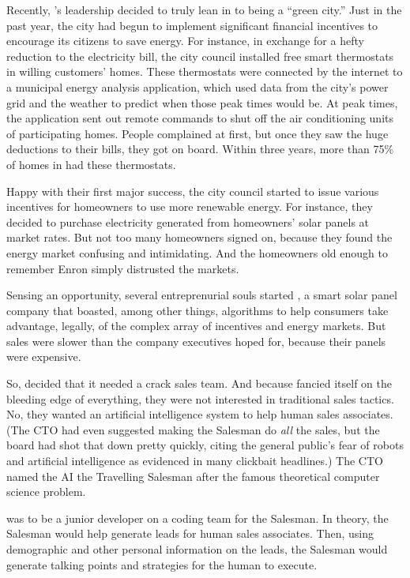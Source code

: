 Recently, \crunchyCity{}'s leadership decided to truly lean in to being a ``green city.'' Just in the past year, the city had begun to implement significant financial incentives to encourage its citizens to save energy. For instance, in exchange for a hefty reduction to the electricity bill, the city council installed free smart thermostats in willing customers' homes. These thermostats were connected by the internet to a municipal energy analysis application, which used data from the city's power grid and the weather to predict when those peak times would be. At peak times, the application sent out remote commands to shut off the air conditioning units of participating homes. People complained at first, but once they saw the huge deductions to their bills, they got on board. Within three years, more than 75\% of homes in \crunchyCity{} had these thermostats.


Happy with their first major success, the city council started to issue various incentives for homeowners to use more renewable energy. For instance, they decided to purchase electricity generated from homeowners' solar panels at market rates. But not too many homeowners signed on, because they found the energy market confusing and intimidating. And the homeowners old enough to remember Enron simply distrusted the markets.

Sensing an opportunity, several entreprenurial souls started \energyCompany{}, a smart solar panel company that boasted, among other things, algorithms to help consumers take advantage, legally, of the complex array of incentives and energy markets. But sales were slower than the company executives hoped for, because their panels were expensive.

So, \energyCompany{} decided that it needed a crack sales team. And because \energyCompany{} fancied itself on the bleeding edge of everything, they were not interested in traditional sales tactics. No, they wanted an artificial intelligence system to help human sales associates. (The \energyCompany{} CTO had even suggested making the Salesman do \emph{all} the sales, but the board had shot that down pretty quickly, citing the general public's fear of robots and artificial intelligence as evidenced in many clickbait headlines.) The CTO named the AI the Travelling Salesman after the famous theoretical computer science problem.

{\protag} was to be a junior developer on a coding team for the Salesman. In theory, the Salesman would help generate leads for human sales associates. Then, using demographic and other personal information on the leads, the Salesman would generate talking points and strategies for the human to execute. 

